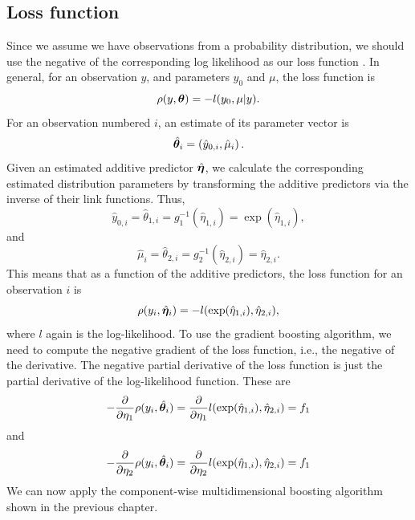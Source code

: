 \subsection{Loss function}
Since we assume we have observations from a probability distribution, we should use the negative of the corresponding log likelihood as our loss function \citep{mayr14a}.
In general, for an observation $y$, and parameters $y_0$ and $\mu$, the loss function is
\begin{equation*}
    \rho(y,\boldsymbol{\theta})=-l(y_{0},\mu|y).
\end{equation*}
For an observation numbered $i$, an estimate of its parameter vector is
\begin{equation*}
    \hat{\boldsymbol{\theta}}_i=\left(\hat{y}_{0,i},\hat{\mu}_i\right).
\end{equation*}
Given an estimated additive predictor $\hat{\boldsymbol{\eta}}$, we calculate the corresponding estimated distribution parameters by transforming the additive predictors via the inverse of their link functions.
Thus,
\begin{equation}
    \hat{y}_{0,i}=\hat{\theta}_{1,i}=g_1^{-1}(\hat{\eta}_{1,i})=\exp(\hat{\eta}_{1,i}),
\end{equation}
and
\begin{equation}
    \hat{\mu}_i=\hat{\theta}_{2,i}=g_2^{-1}(\hat{\eta}_{2,i})=\hat{\eta}_{2,i}.
\end{equation}
This means that as a function of the additive predictors, the loss function for an observation $i$ is
\begin{equation*}
    \rho(y_i,\hat{\boldsymbol{\eta}}_i)=-l(\exp(\hat{\eta}_{1,i}), \hat{\eta}_{2,i}),
\end{equation*}
where $l$ again is the log-likelihood.
To use the gradient boosting algorithm, we need to compute the negative gradient of the loss function, i.e., the negative of the derivative. 
The negative partial derivative of the loss function is just the partial derivative of the log-likelihood function.
These are
\begin{equation}
    -\frac{\partial}{\partial\eta_1}\rho(y_i,\hat{\boldsymbol{\theta}}_i)=\frac{\partial}{\partial\eta_1}l(\exp(\hat{\eta}_{1,i}), \hat{\eta}_{2,i})=f_1
\end{equation}
and
\begin{equation}
    -\frac{\partial}{\partial\eta_2}\rho(y_i,\hat{\boldsymbol{\theta}}_i)=\frac{\partial}{\partial\eta_2}l(\exp(\hat{\eta}_{1,i}), \hat{\eta}_{2,i})=f_1
\end{equation}
We can now apply the component-wise multidimensional boosting algorithm shown in the previous chapter.

